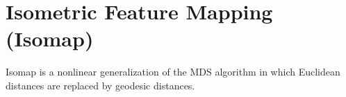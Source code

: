 \section{Isometric Feature Mapping (Isomap)\label{Sec:DR:Isomap}}
Isomap is a nonlinear generalization of the MDS algorithm in which Euclidean distances are replaced by geodesic distances.